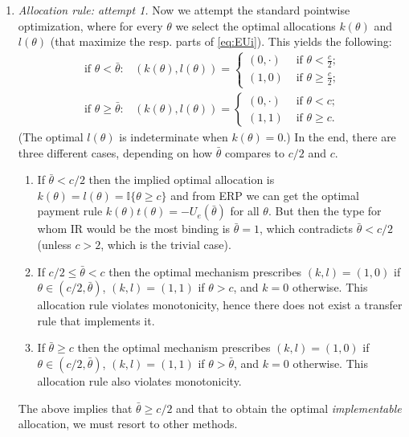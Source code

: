 \documentclass[a4paper]{article}
\begin{document}
\begin{enumerate}
		\item \emph{Allocation rule: attempt 1.} 
		Now we attempt the standard pointwise optimization, where for every $\theta$ we select the optimal allocations $k(\theta)$ and $l(\theta)$ (that maximize the resp. parts of \eqref{eq:EUi}). This yields the following:
		\begin{align*}
			\text{ if } \theta < \bar{\theta}: & (k(\theta),l(\theta)) = 
			\begin{cases}
				(0,\cdot) & \text{ if } \theta < \frac{c}{2};
				\\
				(1,0) & \text{ if } \theta \geq \frac{c}{2};
			\end{cases}
			\\
			\text{ if } \theta \geq \bar{\theta}: & (k(\theta),l(\theta)) = 
			\begin{cases}
				(0,\cdot) & \text{ if } \theta < c;
				\\
				(1,1) & \text{ if } \theta \geq c.
			\end{cases}
		\end{align*}
		(The optimal $l(\theta)$ is indeterminate when $k(\theta)=0$.)
		In the end, there are three different cases, depending on how $\bar{\theta}$ compares to $c/2$ and $c$.
		\begin{enumerate}
			\item If $\bar{\theta} < c/2$ then the implied optimal allocation is $k(\theta)=l(\theta) = \mathbb{I}\{\theta \geq c \}$ and from ERP we can get the optimal payment rule $k(\theta)t(\theta) = -U_e(\bar{\theta})$ for all $\theta$. But then the type for whom IR would be the most binding is $\bar{\theta}=1$, which contradicts $\bar{\theta} < c/2$ (unless $c>2$, which is the trivial case).
			
			\item If $c/2 \leq \bar{\theta} < c$ then the optimal mechanism prescribes $(k,l) = (1,0)$ if $\theta \in (c/2,\bar{\theta})$, $(k,l)=(1,1)$ if $\theta > c$, and $k=0$ otherwise. This allocation rule violates monotonicity, hence there does not exist a transfer rule that implements it.
			
			\item If $\bar{\theta} \geq c$ then the optimal mechanism prescribes $(k,l) = (1,0)$ if $\theta \in (c/2,\bar{\theta})$, $(k,l)=(1,1)$ if $\theta > \bar{\theta}$, and $k=0$ otherwise. This allocation rule also violates monotonicity.
		\end{enumerate}
		The above implies that $\bar{\theta} \geq c/2$ and that to obtain the optimal \emph{implementable} allocation, we must resort to other methods.
		

\end{enumerate}
\end{document}
